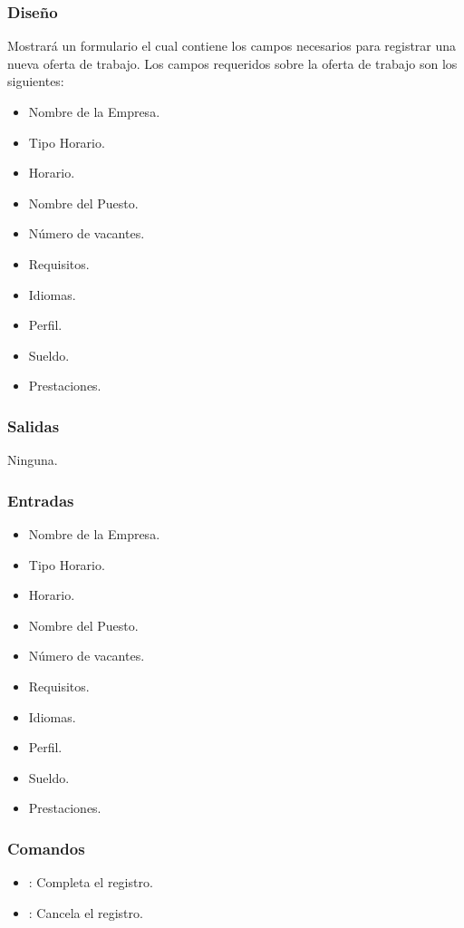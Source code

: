\subsubsection{Diseño}
	Mostrará un formulario el cual contiene los campos necesarios para registrar una nueva oferta de trabajo. 
	Los campos requeridos sobre la oferta de trabajo son los siguientes: 
	\begin{itemize}
		\item Nombre de la Empresa.
		\item Tipo Horario.
		\item Horario.
		\item Nombre del Puesto.
		\item Número de vacantes.
		\item Requisitos.
		\item Idiomas.
		\item Perfil.
		\item Sueldo.
		\item Prestaciones. 
	\end{itemize}


\subsubsection{Salidas}
	Ninguna.

\subsubsection{Entradas}
	\begin{itemize}
		\item Nombre de la Empresa.
		\item Tipo Horario.
		\item Horario.
		\item Nombre del Puesto.
		\item Número de vacantes.
		\item Requisitos.
		\item Idiomas.
		\item Perfil.
		\item Sueldo.
		\item Prestaciones. 
	\end{itemize}

\subsubsection{Comandos}
\begin{itemize}
	\item {}: Completa el registro.  
	\item {}: Cancela el registro.  
\end{itemize}



